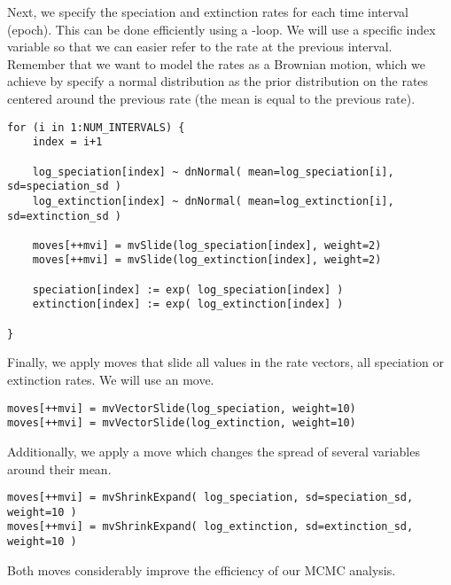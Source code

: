 Next, we specify the speciation and extinction rates for each time interval (\IE epoch).
This can be done efficiently using a -loop.
We will use a specific index variable so that we can easier refer to the rate at the previous interval.
Remember that we want to model the rates as a Brownian motion, which we achieve by specify a normal distribution as the prior distribution on the rates centered around the previous rate (\IE the mean is equal to the previous rate).
{\tt \begin{snugshade*}
\begin{lstlisting}
for (i in 1:NUM_INTERVALS) {
    index = i+1
    
    log_speciation[index] ~ dnNormal( mean=log_speciation[i], sd=speciation_sd )
    log_extinction[index] ~ dnNormal( mean=log_extinction[i], sd=extinction_sd )

    moves[++mvi] = mvSlide(log_speciation[index], weight=2)
    moves[++mvi] = mvSlide(log_extinction[index], weight=2)

    speciation[index] := exp( log_speciation[index] )
    extinction[index] := exp( log_extinction[index] )

}
\end{lstlisting}
\end{snugshade*}}
Finally, we apply moves that slide all values in the rate vectors, \IE all speciation or extinction rates. 
We will use an  move.
{\tt \begin{snugshade*}
\begin{lstlisting}
moves[++mvi] = mvVectorSlide(log_speciation, weight=10)
moves[++mvi] = mvVectorSlide(log_extinction, weight=10)
\end{lstlisting}
\end{snugshade*}}

Additionally, we apply a  move which changes the spread of several variables around their mean.
{\tt \begin{snugshade*}
\begin{lstlisting}
moves[++mvi] = mvShrinkExpand( log_speciation, sd=speciation_sd, weight=10 )
moves[++mvi] = mvShrinkExpand( log_extinction, sd=extinction_sd, weight=10 )
\end{lstlisting}
\end{snugshade*}}
Both moves considerably improve the efficiency of our MCMC analysis.

